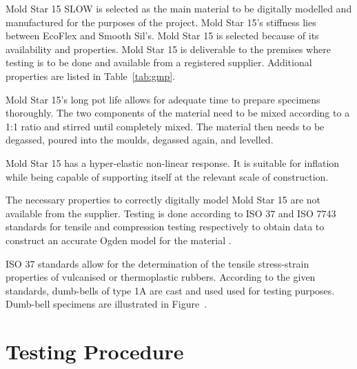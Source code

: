 Mold Star 15 SLOW is selected as the main material to be digitally modelled and manufactured for the purposes of the project. Mold Star 15's stiffness lies between EcoFlex and Smooth Sil's.  Mold Star 15 is selected because of its availability and properties. Mold Star 15 is deliverable to the premises where testing is to be done and available from a registered supplier. Additional properties are listed in Table~\ref{tab:gmp}.

\begin{table}[H]
	\centering
	\caption{Given Material Properties \cite{MoldStar}}
	\label{tab:gmp}
\end{table}

Mold Star 15's long pot life allows for adequate time to prepare specimens thoroughly. The two components of the material need to be mixed according to a 1:1 ratio and stirred until completely mixed. The material then needs to be degassed, poured into the moulds, degassed again, and levelled.

Mold Star 15 has a hyper-elastic non-linear response. It is suitable for inflation while being capable of supporting itself at the relevant scale of construction.

The necessary properties to correctly digitally model Mold Star 15 are not available from the supplier. Testing is done according to ISO 37 and ISO 7743 standards for tensile and compression testing respectively to obtain data to construct an accurate Ogden model for the material \cite{ISO37,ISO7743}.

ISO 37 standards allow for the determination of the tensile stress-strain properties of vulcanised or thermoplastic rubbers. According to the given standards, dumb-bells of type 1A are cast and used used for testing purposes. Dumb-bell specimens are illustrated in Figure~.

\section{Testing Procedure}


